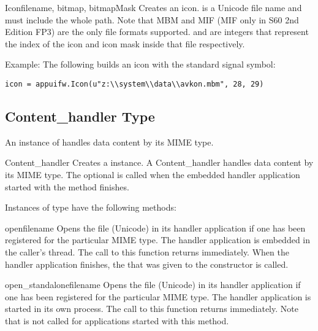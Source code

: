 \begin{classdesc}{Icon}{filename, bitmap, bitmapMask}
Creates an icon.  is a Unicode file name and must 
include the whole path. Note that MBM and MIF (MIF only in S60 2nd 
Edition FP3) are the only file formats supported.  
and  are integers that represent the index of 
the icon and icon mask inside that file respectively.
\end{classdesc}

Example: The following builds an icon with the standard signal symbol:
\begin{verbatim}
icon = appuifw.Icon(u"z:\\system\\data\\avkon.mbm", 28, 29)
\end{verbatim}

\subsection{Content_handler Type}
\label{subsec:content}

An instance of  handles data content by its MIME 
type.

\begin{classdesc}{Content_handler}{}
Creates a  instance. A Content_handler handles
data content by its MIME type. The optional
 is called when the embedded handler application 
started with the  method finishes. 
\end{classdesc}

Instances of  type have the following methods:

\begin{methoddesc}{open}{filename}
Opens the file  (Unicode) in its handler 
application if one has been registered for the particular MIME type. The 
handler application is embedded in the caller's thread. The call to this 
function returns immediately. When the handler application finishes, the 
 that was given to the  
constructor is called.
\end{methoddesc}

\begin{methoddesc}{open_standalone}{filename}
Opens the file  (Unicode) in its handler 
application if one has been registered for the particular MIME type. The 
handler application is started in its own process. The call to this function 
returns immediately. Note that  is not called for 
applications started with this method.
\end{methoddesc}

